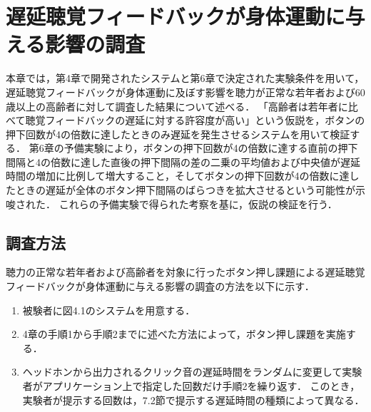 \chapter{遅延聴覚フィードバックが身体運動に与える影響の調査}
本章では，第4章で開発されたシステムと第6章で決定された実験条件を用いて，遅延聴覚フィードバックが身体運動に及ぼす影響を聴力が正常な若年者および60歳以上の高齢者に対して調査した結果について述べる．
「高齢者は若年者に比べて聴覚フィードバックの遅延に対する許容度が高い」という仮説を，ボタンの押下回数が4の倍数に達したときのみ遅延を発生させるシステムを用いて検証する．
第6章の予備実験により，ボタンの押下回数が4の倍数に達する直前の押下間隔と4の倍数に達した直後の押下間隔の差の二乗の平均値および中央値が遅延時間の増加に比例して増大すること，そしてボタンの押下回数が4の倍数に達したときの遅延が全体のボタン押下間隔のばらつきを拡大させるという可能性が示唆された．
これらの予備実験で得られた考察を基に，仮説の検証を行う．
\section{調査方法}
聴力の正常な若年者および高齢者を対象に行ったボタン押し課題による遅延聴覚フィードバックが身体運動に与える影響の調査の方法を以下に示す．
\begin{enumerate}[leftmargin=*]
  \item 被験者に図4.1のシステムを用意する．
  \item 4章の手順1から手順2までに述べた方法によって，ボタン押し課題を実施する．
  \item ヘッドホンから出力されるクリック音の遅延時間をランダムに変更して実験者がアプリケーション上で指定した回数だけ手順2を繰り返す．
  このとき，実験者が提示する回数は，7.2節で提示する遅延時間の種類によって異なる．
\end{enumerate}
